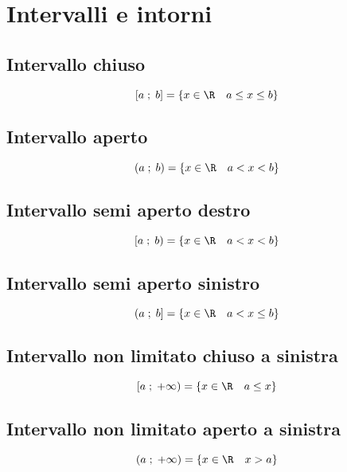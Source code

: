 \chapter{Intervalli e intorni}
\section{Intervallo chiuso}
\begin{equation}
\left[a\; ;\; b\right]=\lbrace x\in\R\quad a\leq x\leq b\rbrace
\end{equation}
\section{Intervallo aperto}
\begin{equation}
\left(a\; ;\; b\right)=\lbrace x\in\R\quad a<x<b\rbrace
\end{equation}
\section{Intervallo semi aperto destro}
\begin{equation}
\left[a\; ;\; b\right)=\lbrace x\in\R\quad a<x<b\rbrace
\end{equation}
\section{Intervallo semi aperto sinistro}
\begin{equation}
\left(a\; ;\; b\right]=\lbrace x\in\R\quad a<x\leq b\rbrace
\end{equation}
\section{Intervallo non limitato chiuso a sinistra}
\begin{equation}
\left[a\; ;\; +\infty\right)=\lbrace x\in\R\quad a\leq x \rbrace
\end{equation}
\section{Intervallo non limitato aperto a sinistra}
\begin{equation}
\left(a\; ;\; +\infty\right)=\lbrace x\in\R\quad x> a\rbrace
\end{equation}
